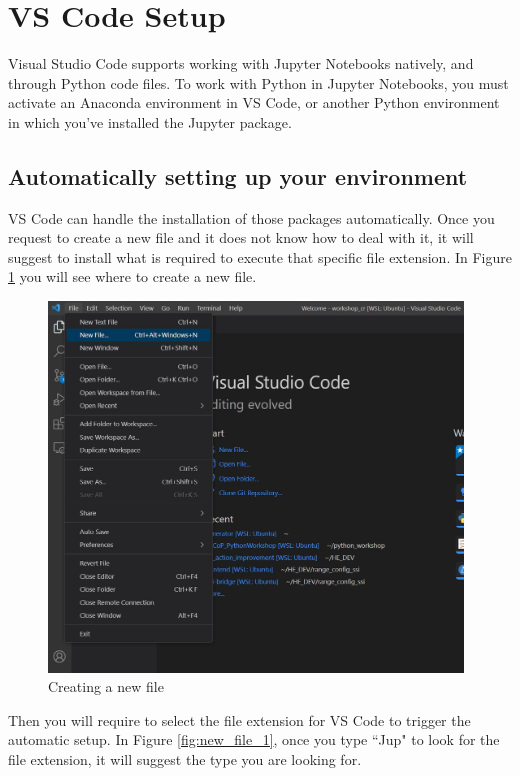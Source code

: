 \documentclass{assignment}
\begin{document}
\newpage

\section{VS Code Setup}
% 

Visual Studio Code supports working with Jupyter Notebooks natively, and through Python code files. To work with Python in Jupyter Notebooks, you must activate an Anaconda environment in VS Code, or another Python environment in which you've installed the Jupyter package. 

\subsection{Automatically setting up your environment}

VS Code can handle the installation of those packages automatically. Once you request to create a new file and it does not know how to deal with it, it will suggest to install what is required to execute that specific file extension. In Figure \ref{fig:new_file_0} you will see where to create a new file.

\begin{figure}[h]
 \centering 
    \includegraphics[width=11cm]{assets/vs_code_new_file.JPG}
    \caption{Creating a new file}
    \label{fig:new_file_0}
\end{figure}

\newpage

Then you will require to select the file extension for VS Code to trigger the automatic setup. In Figure \ref{fig:new_file_1}, once you type ``Jup" to look for the file extension, it will suggest the type you are looking for.
\end{document}
